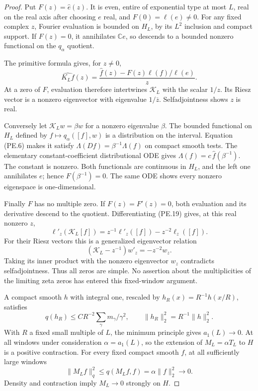 \begin{proof}
Put \(F(z)=\widehat e(z)\).  It is even, entire of exponential
type at most \(L\), real on the real axis after choosing \(e\)
real, and \(F(0)=\ell(e)\ne0\).
For any fixed complex \(z\), Fourier evaluation is bounded on
\(H_L\), by its \(L^2\) inclusion and compact support.
If \(F(z)=0\), it annihilates \(\mathbb C e\), so descends to
a bounded nonzero functional on the \(q_\alpha\) quotient.

The primitive formula gives, for \(z\ne0\),
\[
 \widehat{K_Lf}(z)
        =\frac{\widehat f(z)-F(z)\ell(f)/\ell(e)}{z}.
 \tag{PE.19}
\]
At a zero of \(F\), evaluation therefore intertwines
\(\mathcal K_L\) with the scalar \(1/z\).
Its Riesz vector is a nonzero eigenvector with eigenvalue
\(1/\overline z\).  Selfadjointness shows \(z\) is real.

Conversely let \(\mathcal K_Lw=\beta w\) for a nonzero eigenvalue
\(\beta\).  The bounded functional on \(H_L\) defined by
\(f\mapsto q_\alpha([f],w)\) is a distribution on the interval.
Equation (PE.6) makes it satisfy
\(\Lambda(Df)=\beta^{-1}\Lambda(f)\) on compact smooth tests.
The elementary constant-coefficient distributional ODE gives
\(\Lambda(f)=c\,\widehat f(\beta^{-1})\).
The constant is nonzero.  Both functionals are continuous in
\(H_L\), and the left one annihilates \(e\); hence
\(F(\beta^{-1})=0\).
The same ODE shows every nonzero eigenspace is one-dimensional.

Finally \(F\) has no multiple zero.  If \(F(z)=F'(z)=0\),
both evaluation and its derivative descend to the quotient.
Differentiating (PE.19) gives, at this real nonzero \(z\),
\[
  \ell'_z(\mathcal K_L[f])
       =z^{-1}\ell'_z([f])-z^{-2}\ell_z([f]).
\]
For their Riesz vectors this is a generalized eigenvector relation
\[
       (\mathcal K_L-z^{-1})w'_z=-z^{-2}w_z .
 \tag{PE.20}
\]
Taking its inner product with the nonzero eigenvector \(w_z\)
contradicts selfadjointness.  Thus all zeros are simple.
No assertion about the multiplicities of the limiting zeta
zeros has entered this fixed-window argument.

A compact smooth \(h\) with integral one, rescaled by
\(h_R(x)=R^{-1}h(x/R)\), satisfies
\[
 q(h_R)\le C R^{-2}\sum_\gamma m_\gamma/\gamma^2,
       \qquad \|h_R\|_2^2=R^{-1}\|h\|_2^2 .
\]
With \(R\) a fixed small multiple of \(L\), the minimum principle
gives \(a_1(L)\to0\).
At all windows under consideration \(\alpha=a_1(L)\), so the
extension of \(M_L=\alpha T_L\) to \(H\) is a positive contraction.
For every fixed compact smooth \(f\), at all sufficiently large
windows
\[
 \|M_Lf\|_q^2\le q(M_Lf,f)
                  =\alpha\|f\|_2^2\longrightarrow0 .
 \tag{PE.21}
\]
Density and contraction imply \(M_L\to0\) strongly on \(H\).


\end{proof}
